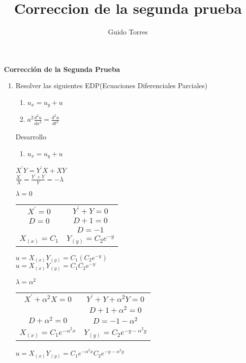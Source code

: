 \documentclass[10pt,a4paper]{article}
\author{Guido Torres}
\title{Correccion de la segunda prueba}
\begin{document}
\begin{center}

\textbf{Corrección de la Segunda Prueba}

\end{center}
\begin{enumerate}

\item Resolver las siguientes EDP(Ecuaciones Diferenciales Parciales)

\begin{enumerate}
\item $u_x=u_y+u$
\item $a^2 \frac{d^2u}{{dx}^2}=\frac{d^2u}{{dt}^2}$ 
\end{enumerate}

Desarrollo
\begin{enumerate}
\item $u_x=u_y+u$
\end{enumerate}
\begin{center}
${ X }^{ ' }Y={ Y }^{ ' }X+XY$
\\
$\frac { { X }^{ ' } }{ X } =\frac { { Y }^{ ' }+Y }{ Y } =-\lambda $

\end{center}

\begin{center}
$\lambda=0$
\end{center}
\begin{center}
\begin{tabular}{c c} 
 
${ X }^{ ' }=0$ & ${ Y }^{ ' }+Y=0$   \\ 
$D=0$ & $D+1=0$  \\ 
  & $D=-1$  \\ 
$X_{(x)}=C_1$ & $Y_{(y)}=C_2 e^{-y}$  \\ 
\end{tabular}
\end{center}
$u=X_{(x)} Y_{(y)}=C_1(C_2 e^{-y})$
\\
$u=X_{(x)} Y_{(y)}=C_1C_2 e^{-y}$


\begin{center}
$\lambda=\alpha^2$
\end{center}

\begin{center}
\begin{tabular}{c c} 
 
${ X }^{ ' }+{ \alpha  }^{ 2 }X=0$ & ${ Y }^{ ' }+Y+{\alpha}^2 Y=0$   \\ 
                                   & $D+1+{\alpha}^2=0$  \\ 
$D+{ \alpha  }^{ 2 }=0$ & $D=-1-{\alpha}^2$  \\ 
$X_{(x)}=C_1 e^{-{\alpha}^2 x}$ & $Y_{(y)}=C_2 e^{-y-{\alpha}^2 y}$  \\ 
\end{tabular}
\end{center}
$u=X_{(x)} Y_{(y)}=C_1 e^{-{\alpha}^2 x} C_2 e^{-y-{\alpha}^2 y}$



\end{enumerate}
\end{document}
